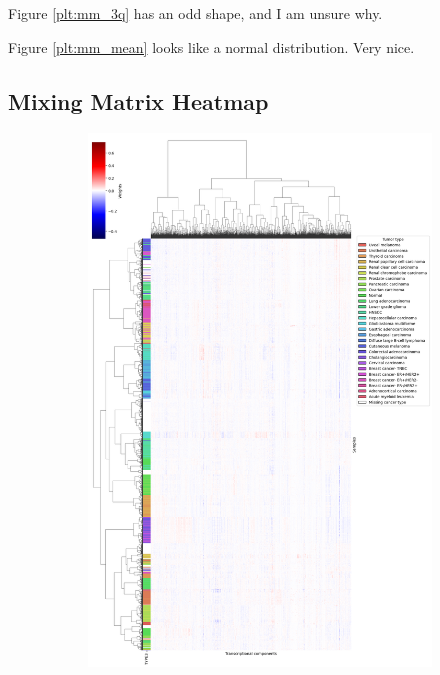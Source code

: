 Figure \ref{plt:mm_3q} has an odd shape, and I am unsure why.

Figure \ref{plt:mm_mean} looks like a normal distribution. Very nice.

\subsection{Mixing Matrix Heatmap}

\begin{figure}[H]
    \centering
    \begin{subfigure}[t]{.3\textwidth}
        \centering
        \includegraphics[scale=0.3]{images/mm_heatmap_w_missing_tt.png}

\end{subfigure}
\end{figure}

